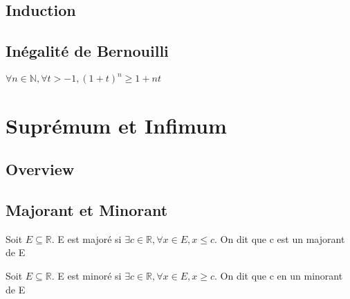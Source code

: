 \documentclass{article}
\begin{document}
\subsection{Induction}


\subsection{Inégalité de Bernouilli}

\begin{theorem}
    $ \forall n \in \mathbb{N}, \forall t > -1, (1+t)^n \geq 1+nt$
\end{theorem}

\pagebreak

\section{Suprémum et Infimum}

\subsection{Overview}

\subsection{Majorant et Minorant}

\begin{definition}[Majorant]
    Soit $E \subseteq \mathbb{R}$. E est majoré si $\exists c \in \mathbb{R}, \forall
    x \in E, x \leq c$. On dit que c est un majorant de E
\end{definition}

\begin{definition}[Minorant]
    Soit $E \subseteq \mathbb{R}$. E est minoré si $\exists c \in \mathbb{R}, \forall
    x \in E, x \geq c$. On dit que c en un minorant de E
\end{definition}
\end{document}
